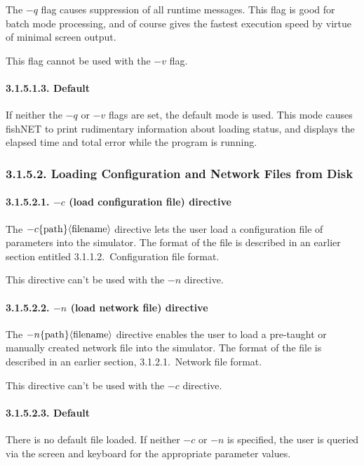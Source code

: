 \documentclass[12pt]{report}
\begin{document}
The $-q$ flag causes suppression of all runtime messages.
This flag is good for batch mode processing, and of course gives the
fastest execution speed by virtue of minimal screen output.

This flag cannot be used with the $-v$ flag.

\paragraph{3.1.5.1.3. Default}

If neither the $-q$ or $-v$ flags are set, the default mode is used.
This mode causes fishNET to print rudimentary information 
about loading status, and
displays the elapsed time and total error while the program is
running.

\subsubsection{3.1.5.2. Loading Configuration and Network Files from Disk}

\paragraph{3.1.5.2.1. $-c$ (load configuration file) directive}

The $-c\{{\rm path}\}\langle{\rm file name}\rangle$ directive lets
the user load a configuration file of parameters into the simulator.
The format of the file is described in an earlier section entitled
3.1.1.2.~Configuration file format.

This directive can't be used with the $-n$ directive.

\paragraph{3.1.5.2.2. $-n$ (load network file) directive}

The $-n\{{\rm path}\}\langle{\rm file name}\rangle$ directive enables
the user to load a pre-taught or manually created network file into the
simulator.
The format of the file is described in an earlier section, 
3.1.2.1.~Network file format.

This directive can't be used with the $-c$ directive.

\paragraph{3.1.5.2.3. Default}

There is no default file loaded.
If neither $-c$ or $-n$ is specified, the user is queried via the
screen and keyboard for the appropriate parameter values.
\end{document}
